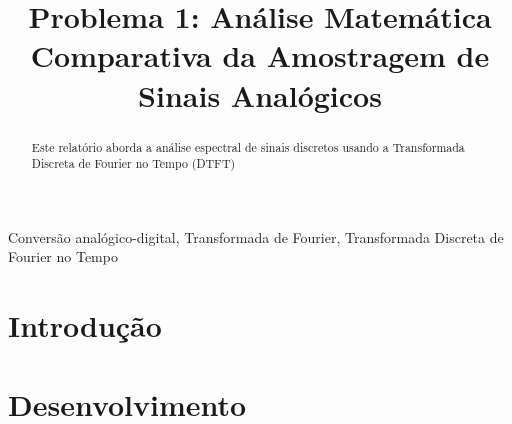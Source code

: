 \documentclass[conference]{IEEEtran}
\begin{document}
\makeatletter
\newcommand{\linebreakand}{%
    \end{@IEEEauthorhalign}
    \hfill\mbox{}\par
    \mbox{}\hfill\begin{@IEEEauthorhalign}
}
\makeatother

\title{Problema 1: Análise Matemática Comparativa da Amostragem de Sinais Analógicos\\
}

\author{
    \and
    \IEEEauthorblockN{}
    \IEEEauthorblockA{}
}

\maketitle

\begin{abstract}
    Este relatório aborda a análise espectral de sinais discretos usando a Transformada Discreta de Fourier no Tempo (DTFT)


\end{abstract}

\begin{IEEEkeywords}
    Conversão analógico-digital, Transformada de Fourier, Transformada Discreta de Fourier no Tempo
\end{IEEEkeywords}

\section{Introdução}


\section{Desenvolvimento}

\end{document}
